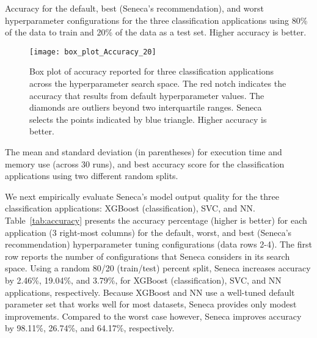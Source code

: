 \begin{table}
\centering

\caption{Accuracy for the 
default, best (Seneca's recommendation), and worst hyperparameter configurations for 
the three classification applications using 80\% of the data to train and 20\%
of the data as a test set. Higher accuracy is better.
\label{tab:accuracy}}
\vspace{-0.1in}
\end{table}

\begin{figure}[t] \centering 
\vspace{-0.1in}
\texttt{[image: box\_plot\_Accuracy\_20]}
\vspace{-0.4in}
\caption{Box plot of accuracy reported for three classification applications across 
the hyperparameter search space. The red notch indicates the accuracy that results
from default hyperparameter values.
The diamonds are outliers beyond two interquartile ranges. 
Seneca selects the points indicated by blue triangle. 
Higher accuracy is better. 
\label{fig:box_plot_accuracy}}
\vspace{-0.2in}
\end{figure}

\begin{table}[t]
\centering
\scriptsize

\caption{The mean and standard deviation (in parentheses) for execution time and memory use 
(across 30 runs),
and best accuracy score for the classification applications using two different random splits. 
\label{tab:exec_memory}}
\vspace{-0.1in}
\end{table}


We next empirically evaluate Seneca's model output quality for the three
classification applications: XGBoost (classification), SVC, and NN.
Table~\ref{tab:accuracy} presents the accuracy percentage (higher is better)
for each application (3 right-most columns)
for the default, worst, and best (Seneca's recommendation) hyperparameter tuning
configurations (data rows 2-4).
The first row 
reports the number of configurations that Seneca considers in its search space.
Using a random 80/20 (train/test) percent split,
Seneca increases accuracy by 2.46\%, 19.04\%, and 3.79\%, for XGBoost
(classification), SVC, and NN applications, respectively.  
Because XGBoost and NN use a well-tuned default parameter set that works well for most datasets, Seneca provides only modest improvements.
Compared to the worst case however, Seneca improves accuracy by 98.11\%, 26.74\%, and 64.17\%,
respectively.  


